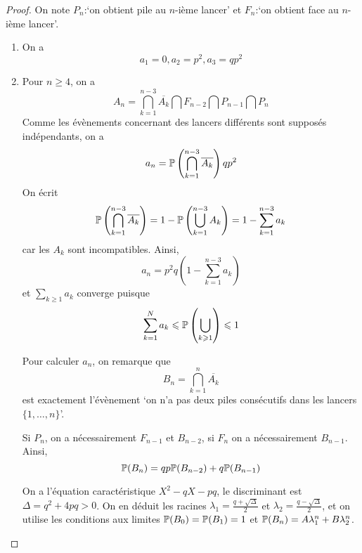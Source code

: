 \begin{proof}
    On note $P_{n}$:`on obtient pile au $n$-ième lancer' et $F_{n}$:`on obtient face au $n$-ième lancer'.
    \begin{enumerate}
        \item On a 
        \begin{equation}
            \boxed{a_{1}=0,a_{2}=p^{2},a_{3}=qp^{2}}
        \end{equation}
        \item Pour $n\geqslant4$, on a 
        \begin{equation}
            A_{n}=\bigcap_{k=1}^{n-3}\overline{A_{k}}\bigcap F_{n-2}\bigcap P_{n-1}\bigcap P_{n}
        \end{equation}
        Comme les évènements concernant des lancers différents sont supposés indépendants, on a 
        \begin{equation}
            a_{n}=\P\left(\bigcap_{k=1}^{n-3}\overline{A_{k}}\right)qp^{2}
        \end{equation}
        On écrit 
        \begin{equation}
            \P\left(\bigcap_{k=1}^{n-3}\overline{A_{k}}\right)=1-\P\left(\bigcup_{k=1}^{n-3}A_{k}\right)=1-\sum_{k=1}^{n-3}a_{k}
        \end{equation}
        car les $A_{k}$ sont incompatibles. Ainsi, 
        \begin{equation}
            a_{n}=p^{2}q\left(1-\sum_{k=1}^{n-3}a_{k}\right)
        \end{equation}
        et $\sum_{k\geqslant1}a_{k}$ converge puisque 
        \begin{equation}
            \sum_{k=1}^{N}a_{k}\leqslant\P\left(\bigcup_{k\geqslant1}\right)\leqslant1
        \end{equation}

        Pour calculer $a_{n}$, on remarque que 
        \begin{equation}
            B_{n}=\bigcap_{k=1}^{n}\overline{A_{k}}
        \end{equation}
        est exactement l'évènement `on n'a pas deux piles consécutifs dans les lancers $\lbrace1,\dots,n\rbrace$'.

        Si $P_{n}$, on a nécessairement $F_{n-1}$ et $B_{n-2}$, si $F_{n}$ on a nécessairement $B_{n-1}$. Ainsi,
        \begin{equation}
            \P(B_{n})=qp\P(B_{n-2})+q\P(B_{n-1})
        \end{equation}

        On a l'équation caractéristique $X^{2}-qX-pq$, le discriminant est $\Delta=q^{2}+4pq>0$. On en déduit les racines $\lambda_{1}=\frac{q+\sqrt{\Delta}}{2}$ et $\lambda_{2}=\frac{q-\sqrt{\Delta}}{2}$, et on utilise les conditions aux limites $\P(B_{0})=\P(B_{1})=1$ et $\P(B_{n})=A\lambda_{1}^{n}+B\lambda_{2}^{n}$.
    \end{enumerate}
\end{proof}

